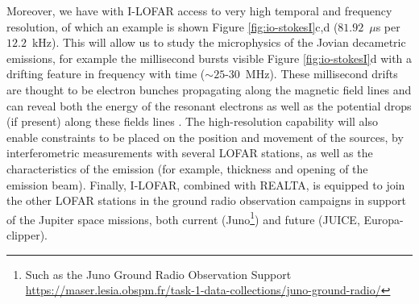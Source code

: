 Moreover, we have with I-LOFAR access to very high temporal and frequency resolution, of which an example is shown Figure \ref{fig:io-stokesI}c,d ($81.92$~$\mu$s per $12.2$~kHz). This will allow us to study the microphysics of the Jovian decametric emissions, for example the millisecond bursts visible Figure \ref{fig:io-stokesI}d with a drifting feature in frequency with time ($\sim 25$-$30$~MHz). These millisecond drifts are thought to be electron bunches propagating along the magnetic field lines and can reveal both the energy of the resonant electrons as well as the potential drops (if present) along these fields lines \citep{Hess2007, Hess2009}. The high-resolution capability will also enable constraints to be placed on the position and movement of the sources, by interferometric measurements with several LOFAR stations, as well as the characteristics of the emission (for example, thickness and opening of the emission beam). Finally, I-LOFAR, combined with REALTA, is equipped to join the other LOFAR stations in the ground radio observation campaigns in support of the Jupiter space missions, both current (Juno\footnote{Such as the Juno Ground Radio Observation Support \hyperref[Juno]{https://maser.lesia.obspm.fr/task-1-data-collections/juno-ground-radio/}}) and future (JUICE, Europa-clipper).




